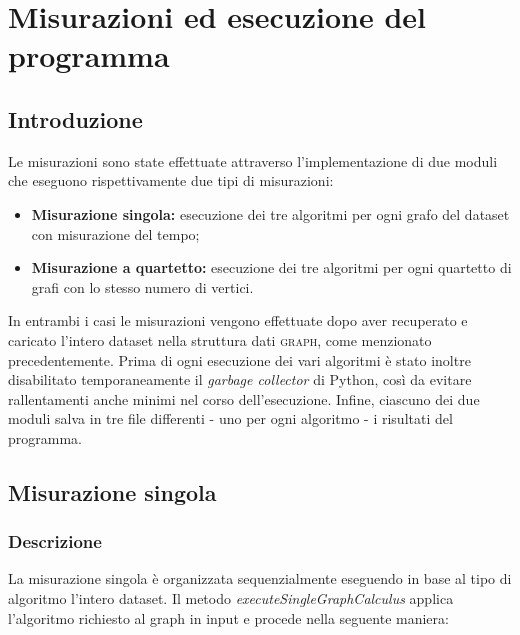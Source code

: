 \section{Misurazioni ed esecuzione del programma}

\subsection{Introduzione} %

Le misurazioni sono state effettuate attraverso l'implementazione di due moduli che eseguono rispettivamente due tipi di misurazioni:

\begin{itemize}
    \item \textbf{Misurazione singola:} esecuzione dei tre algoritmi per ogni grafo del dataset con misurazione del tempo;
    \item \textbf{Misurazione a quartetto:} esecuzione dei tre algoritmi per ogni quartetto di grafi con lo stesso numero di vertici.
\end{itemize}

In entrambi i casi le misurazioni vengono effettuate dopo aver recuperato e caricato l'intero dataset nella struttura dati \textsc{graph}, come menzionato precedentemente.
Prima di ogni esecuzione dei vari algoritmi è stato inoltre disabilitato temporaneamente il \textit{garbage collector} di Python, così da evitare rallentamenti anche minimi nel corso dell'esecuzione. Infine, ciascuno dei due moduli salva in tre file differenti - uno per ogni algoritmo - i risultati del programma.


\subsection{Misurazione singola}

\subsubsection{Descrizione} 

La misurazione singola è organizzata sequenzialmente eseguendo in base al tipo di algoritmo l'intero dataset. Il metodo \textit{executeSingleGraphCalculus} applica l'algoritmo richiesto al graph in input e procede nella seguente maniera:

